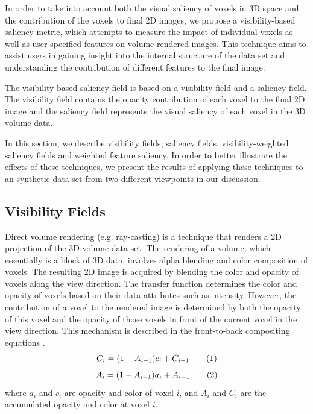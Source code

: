 In order to take into account both the visual saliency of voxels in 3D space and the contribution of the voxels to final 2D images, we propose a visibility-based saliency metric, which attempts to measure the impact of individual voxels as well as user-specified features on volume rendered images.
This technique aims to assist users in gaining insight into the internal structure of the data set and understanding the contribution of different features to the final image.

The visibility-based saliency field is based on a visibility field and a saliency field. The visibility field contains the opacity contribution of each voxel to the final 2D image and the saliency field represents the visual saliency of each voxel in the 3D volume data.

In this section, we describe visibility fields, saliency fields, visibility-weighted saliency fields and weighted feature saliency. In order to better illustrate the effects of these techniques, we present the results of applying these techniques to an synthetic data set from two different viewpoints in our discussion.

\subsection{Visibility Fields \label{visibility_fields}}
Direct volume rendering (e.g. ray-casting) is a technique that renders a 2D projection of the 3D volume data set. The rendering of a volume, which essentially is a block of 3D data, involves alpha blending and color composition of voxels. The resulting 2D image is acquired by blending the color and opacity of voxels along the view direction. The transfer function determines the color and opacity of voxels based on their data attributes such as intensity. However, the contribution of a voxel to the rendered image is determined by both the opacity of this voxel and the opacity of those voxels in front of the current voxel in the view direction.
This mechanism is described in the front-to-back compositing equations \cite{emsenhuber_visibility_2008}.
\[
C_{i}=(1-A_{i-1})c_{i}+C_{i-1}
\addtag \]
\[
A_{i}=(1-A_{i-1})a_{i}+A_{i-1}
\addtag \]
where $ a_{i} $ and $ c_{i} $ are opacity and color of voxel $ i $, and $A_{i}$ and $C_{i}$ are the accumulated opacity and color at  voxel $ i $.

